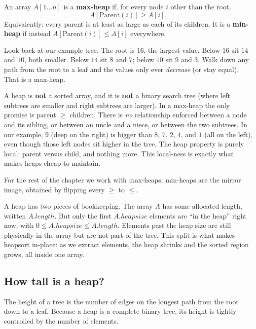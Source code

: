 \begin{formalbox}
An array $A[1\ldots n]$ is a \textbf{max-heap} if, for every node $i$ other than
the root,
\[
  A[\mathrm{Parent}(i)] \ge A[i].
\]
Equivalently: every parent is at least as large as each of its children. It is a
\textbf{min-heap} if instead $A[\mathrm{Parent}(i)] \le A[i]$ everywhere.
\end{formalbox}

Look back at our example tree. The root is $16$, the largest value. Below $16$
sit $14$ and $10$, both smaller. Below $14$ sit $8$ and $7$; below $10$ sit $9$
and $3$. Walk down any path from the root to a leaf and the values only ever
\emph{decrease} (or stay equal). That is a max-heap.

\begin{trapbox}
A heap is \textbf{not} a sorted array, and it is \textbf{not} a binary search
tree (where left subtrees are smaller and right subtrees are larger). In a max-heap the only promise is parent $\ge$ children. There is
\emph{no} relationship enforced between a node and its sibling, or between an
uncle and a niece, or between the two subtrees. In our example, $9$ (deep on the
right) is bigger than $8$, $7$, $2$, $4$, and $1$ (all on the left), even though
those left nodes sit higher in the tree. The heap property is purely local:
parent versus child, and nothing more. This local-ness is exactly what makes
heaps cheap to maintain.
\end{trapbox}

For the rest of the chapter we work with max-heaps; min-heaps are the mirror
image, obtained by flipping every $\ge$ to $\le$.

\begin{focusbox}
A heap has two pieces of bookkeeping. The array $A$ has some allocated
length, written $A.\mathit{length}$. But only the first $A.\mathit{heapsize}$
elements are ``in the heap'' right now, with $0 \le A.\mathit{heapsize} \le
A.\mathit{length}$. Elements past the heap size are still physically in the
array but are not part of the tree. This split is what makes
heapsort in-place: as we extract elements, the heap shrinks and the sorted
region grows, all inside one array.
\end{focusbox}

\subsection{How tall is a heap?}

The height of a tree is the number of edges on the longest path from the root
down to a leaf. Because a heap is a complete binary tree, its height is tightly
controlled by the number of elements.

